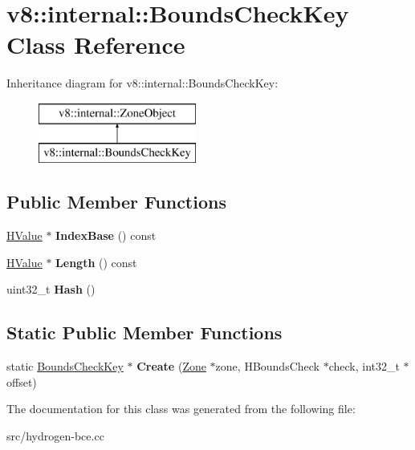 \hypertarget{classv8_1_1internal_1_1_bounds_check_key}{}\section{v8\+:\+:internal\+:\+:Bounds\+Check\+Key Class Reference}
\label{classv8_1_1internal_1_1_bounds_check_key}
Inheritance diagram for v8\+:\+:internal\+:\+:Bounds\+Check\+Key\+:\begin{figure}[H]
\begin{center}
\leavevmode
\includegraphics[height=2.000000cm]{classv8_1_1internal_1_1_bounds_check_key}
\end{center}
\end{figure}
\subsection*{Public Member Functions}
\begin{DoxyCompactItemize}
\item 
\hypertarget{classv8_1_1internal_1_1_bounds_check_key_aeb1db461583e7055f141afc96ba1180a}{}\hyperlink{classv8_1_1internal_1_1_h_value}{H\+Value} $\ast$ {\bfseries Index\+Base} () const \label{classv8_1_1internal_1_1_bounds_check_key_aeb1db461583e7055f141afc96ba1180a}

\item 
\hypertarget{classv8_1_1internal_1_1_bounds_check_key_a3a10a7211da00964908fea5db326e9a1}{}\hyperlink{classv8_1_1internal_1_1_h_value}{H\+Value} $\ast$ {\bfseries Length} () const \label{classv8_1_1internal_1_1_bounds_check_key_a3a10a7211da00964908fea5db326e9a1}

\item 
\hypertarget{classv8_1_1internal_1_1_bounds_check_key_a0eec34fbaaf08be0e30937895419e58a}{}uint32\+\_\+t {\bfseries Hash} ()\label{classv8_1_1internal_1_1_bounds_check_key_a0eec34fbaaf08be0e30937895419e58a}

\end{DoxyCompactItemize}
\subsection*{Static Public Member Functions}
\begin{DoxyCompactItemize}
\item 
\hypertarget{classv8_1_1internal_1_1_bounds_check_key_aa50c37a0be21326cf120f4734f4f0867}{}static \hyperlink{classv8_1_1internal_1_1_bounds_check_key}{Bounds\+Check\+Key} $\ast$ {\bfseries Create} (\hyperlink{classv8_1_1internal_1_1_zone}{Zone} $\ast$zone, H\+Bounds\+Check $\ast$check, int32\+\_\+t $\ast$offset)\label{classv8_1_1internal_1_1_bounds_check_key_aa50c37a0be21326cf120f4734f4f0867}

\end{DoxyCompactItemize}


The documentation for this class was generated from the following file\+:\begin{DoxyCompactItemize}
\item 
src/hydrogen-\/bce.\+cc\end{DoxyCompactItemize}

